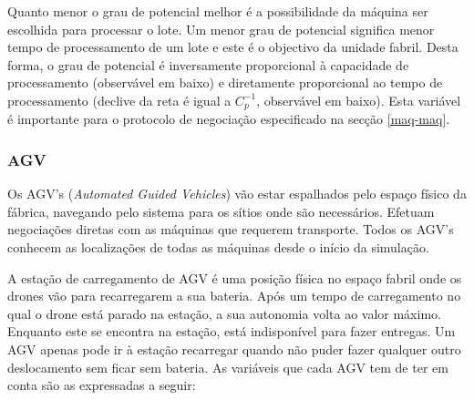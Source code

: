 \begin{titlepage}
Quanto menor o grau de potencial melhor é a possibilidade da máquina ser escolhida para processar o lote. Um menor grau de potencial significa menor tempo de processamento de um lote e este é o objectivo da unidade fabril. Desta forma, o grau de potencial é inversamente proporcional à capacidade de processamento (observável em baixo) e diretamente proporcional ao tempo de processamento (declive da reta é igual a $C_{p}^{-1}$, observável em baixo). Esta variável é importante para o protocolo de negociação especificado na secção \ref{maq-maq}.



\subsubsection{AGV}

Os AGV's (\textit{Automated Guided Vehicles}) vão estar espalhados pelo espaço físico da fábrica, navegando pelo sistema para os sítios onde são necessários. Efetuam negociações diretas com as máquinas que requerem transporte. Todos os AGV's conhecem as localizações de todas as máquinas desde o início da simulação.\newline

A estação de carregamento de AGV é uma posição física no espaço fabril onde os drones vão para recarregarem a sua bateria. Após um tempo de carregamento no qual o drone está parado na estação, a sua autonomia volta ao valor máximo. Enquanto este se encontra na estação, está indisponível para fazer entregas. Um AGV apenas pode ir à estação recarregar quando não puder fazer qualquer outro deslocamento sem ficar sem bateria.\newline
\newpage
As variáveis que cada AGV tem de ter em conta são as expressadas a seguir:


\end{titlepage}
